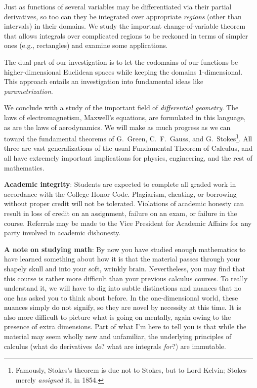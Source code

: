 \documentclass[12pt,twoside]{amsart}
\begin{document}
Just as functions of several variables may be differentiated via their partial derivatives, so too can they be integrated over appropriate \emph{regions} (other than intervals) in their domains. We study the important change-of-variable theorem that allows integrals over complicated regions to be reckoned in terms of simpler ones (e.g., rectangles) and examine some applications. 

The dual part of our investigation is to let the codomains of our functions be higher-dimensional Euclidean spaces while keeping the domains 1-dimensional. This approach entails an investigation into fundamental ideas like \emph{parametrization}.

We conclude with a study of the important field of \emph{differential geometry}. The laws of electromagnetism, Maxwell's equations, are formulated in this language, as are the laws of aerodynamics. We will make as much progress as we can toward the fundamental theorems of G.\ Green, C.\ F.\ Gauss, and G.\ Stokes\footnote{Famously, Stokes's theorem is due not to Stokes, but to Lord Kelvin; Stokes merely \emph{assigned} it, in 1854.}. All three are vast generalizations of the usual Fundamental Theorem of Calculus, and all have extremely important implications for physics, engineering, and the rest of mathematics.

\textbf{Academic integrity}: Students are expected to complete all graded work in accordance with the College Honor Code. Plagiarism, cheating, or borrowing without proper credit will not be tolerated.  Violations of academic honesty can result in loss of credit on an assignment, failure on an exam, or failure in the course. Referrals may be made to the Vice President for Academic Affairs for any party involved in academic dishonesty.

\textbf{A note on studying math}: By now you have studied enough mathematics to have learned something about how it is that the material passes through your shapely skull and into your soft, wrinkly brain. Nevertheless, you may find that this course is rather more difficult than your previous calculus courses. To really understand it, we will have to dig into subtle distinctions and nuances that no one has asked you to think about before. In the one-dimensional world, these nuances simply do not signify, so they are novel by necessity at this time. It is also more difficult to picture what is going on mentally, again owing to the presence of extra dimensions. Part of what I'm here to tell you is that while the material may seem wholly new and unfamiliar, the underlying principles of calculus (what do derivatives \emph{do}? what are integrals \emph{for}?) are immutable.
\end{document}
